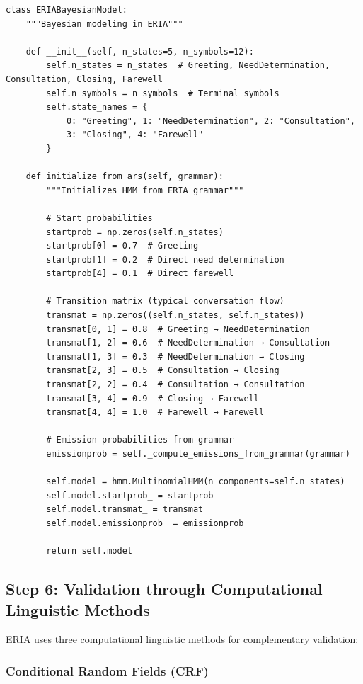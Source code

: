 \documentclass[12pt,a4paper]{article}
\begin{document}
\begin{lstlisting}[caption=HMM for ERIA]
class ERIABayesianModel:
    """Bayesian modeling in ERIA"""
    
    def __init__(self, n_states=5, n_symbols=12):
        self.n_states = n_states  # Greeting, NeedDetermination, Consultation, Closing, Farewell
        self.n_symbols = n_symbols  # Terminal symbols
        self.state_names = {
            0: "Greeting", 1: "NeedDetermination", 2: "Consultation",
            3: "Closing", 4: "Farewell"
        }
    
    def initialize_from_ars(self, grammar):
        """Initializes HMM from ERIA grammar"""
        
        # Start probabilities
        startprob = np.zeros(self.n_states)
        startprob[0] = 0.7  # Greeting
        startprob[1] = 0.2  # Direct need determination
        startprob[4] = 0.1  # Direct farewell
        
        # Transition matrix (typical conversation flow)
        transmat = np.zeros((self.n_states, self.n_states))
        transmat[0, 1] = 0.8  # Greeting → NeedDetermination
        transmat[1, 2] = 0.6  # NeedDetermination → Consultation
        transmat[1, 3] = 0.3  # NeedDetermination → Closing
        transmat[2, 3] = 0.5  # Consultation → Closing
        transmat[2, 2] = 0.4  # Consultation → Consultation
        transmat[3, 4] = 0.9  # Closing → Farewell
        transmat[4, 4] = 1.0  # Farewell → Farewell
        
        # Emission probabilities from grammar
        emissionprob = self._compute_emissions_from_grammar(grammar)
        
        self.model = hmm.MultinomialHMM(n_components=self.n_states)
        self.model.startprob_ = startprob
        self.model.transmat_ = transmat
        self.model.emissionprob_ = emissionprob
        
        return self.model
\end{lstlisting}

\subsection{Step 6: Validation through Computational Linguistic Methods}

ERIA uses three computational linguistic methods for complementary validation:

\subsubsection{Conditional Random Fields (CRF)}
\end{document}
